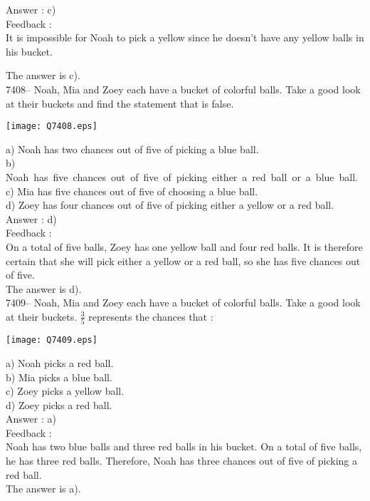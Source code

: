 \documentclass[letterpaper, 12pt]{article}
\begin{document}
Answer : c)\\

Feedback :\\
It is impossible for Noah to pick a yellow since he doesn't have any yellow balls in his bucket.

The answer is c).\\


7408-- Noah, Mia and Zoey each have a bucket of colorful balls. Take a good look at their buckets and find the statement that is false.\\
\begin{center}
\texttt{[image: Q7408.eps]}
\end{center}

a) Noah has two chances out of five of picking a blue ball.\\
b) \mbox{Noah has five chances out of five of picking either a red ball or a blue ball.}\\
c) Mia has five chances out of five of choosing a blue ball.\\
d) Zoey has four chances out of five of picking either a yellow or a red ball.\\

Answer : d)\\

Feedback :\\
On a total of five balls, Zoey has one yellow ball and four red balls. It is therefore certain that she will pick either a yellow or a red ball, so she has five chances out of five.\\
The answer is d).\\

7409-- Noah, Mia and Zoey each have a bucket of colorful balls. Take a good look at their buckets. $\frac{3}{5}$ represents the chances that :\\
\begin{center}
\texttt{[image: Q7409.eps]}
\end{center}
a) Noah picks a red ball.\\
b) Mia picks a blue ball.\\
c) Zoey picks a yellow ball.\\
d) Zoey picks a red ball.\\

Answer : a)\\

Feedback :\\
Noah has two blue balls and three red balls in his bucket. On a total of five balls, he has three red balls. Therefore, Noah has three chances out of five of picking a red ball.\\
The answer is a).\\
\end{document}
